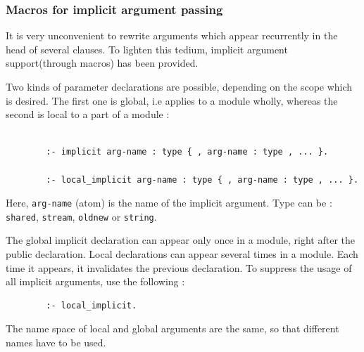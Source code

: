 \subsubsection{Macros for implicit argument passing}

It is very unconvenient to rewrite arguments which appear recurrently in the
head of several clauses. To lighten this tedium, implicit argument
 support(through macros) has been provided.

Two kinds of parameter declarations are possible, depending on the scope which
is desired. The first one is global, i.e applies to a module wholly,
whereas the second is local to a part of a module :
\begin{verbatim}

        :- implicit arg-name : type { , arg-name : type , ... }.

        :- local_implicit arg-name : type { , arg-name : type , ... }.

\end{verbatim}
 
Here, \verb|arg-name| (atom) is the name of the implicit argument.
Type can be : \verb|shared|, \verb|stream|, \verb|oldnew|
or \verb|string|.

The global implicit declaration can appear only once in a module, right after
the public declaration.
Local declarations can appear several times in a module.
Each time it appears, it invalidates the previous declaration. To suppress
the usage of all implicit arguments, use the following :
\begin{verbatim}
        :- local_implicit.
\end{verbatim}
The name space of local and global arguments are the same, so that different
names have to be used.

